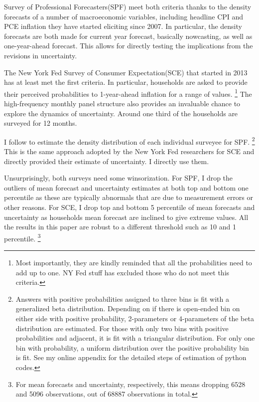 \documentclass[12pt]{article}
\begin{document}
	Survey of Professional Forecasters(SPF) meet both criteria thanks to the density forecasts of a number of macroeconomic variables, including headline CPI and PCE inflation they have started eliciting since 2007. In particular, the density forecasts are both made for current year forecast, basically nowcasting, as well as one-year-ahead forecast. This allows for directly testing the implications from the revisions in uncertainty.  
	
	The New York Fed Survey of Consumer Expectation(SCE) that started in 2013 has at least met the first criteria. In particular, households are asked to provide their perceived probabilities to 1-year-ahead inflation for a range of values. \footnote{Most importantly, they are kindly reminded that all the probabilities need to add up to one. NY Fed stuff has excluded those who do not meet this criteria.} The high-frequency monthly panel structure also provides an invaluable chance to explore the dynamics of uncertainty. Around one third of the households are surveyed for 12 months.  
	
	I follow \citet{engelberg2009comparing} to estimate the density distribution of each individual surveyee for SPF. \footnote{Answers with positive probabilities assigned to three bins is fit with a generalized beta distribution. Depending on if there is open-ended bin on either side with positive probability, 2-parameters or 4-parameters of the beta distribution are estimated. For those with only two bins with positive probabilities and adjacent, it is fit with a triangular distribution. For only one bin with probability, a uniform distribution over the positive probability bin is fit. See my online appendix for the detailed steps of estimation of python codes.} This is the same approach adopted by the New York Fed researchers \citet{armantier2017overview} for SCE and directly provided their estimate of uncertainty. I directly use them. 
	
	Unsurprisingly, both surveys need some  winsorization. For SPF, I drop the outliers of mean forecast and uncertainty estimates at both top and bottom one percentile as these are typically abnormals that are due to measurement errors or other reasons.   For SCE, I drop top and bottom 5 percentile of mean forecasts and uncertainty as households mean forecast are inclined to give extreme values. All the results in this paper are robust to a different threshold such as 10 and 1 percentile. \footnote{For mean forecasts and uncertainty, respectively, this means dropping 6528 and 5096 observations, out of 68887 observations in total.}
	
\end{document}
